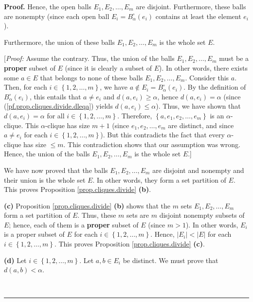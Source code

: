 \documentclass[numbers=enddot,12pt,final,onecolumn,notitlepage]{scrartcl}%
\theoremstyle{definition}
\newenvironment{proof}[1][Proof]{\noindent\textbf{#1.} }{\ \rule{0.5em}{0.5em}}
\renewcommand{\leq}{\leqslant}
\renewcommand{\geq}{\geqslant}
\theoremstyle{plainsl}
\begin{document}
\begin{proof}
Hence, the open balls $E_{1},E_{2},\ldots,E_{m}$ are disjoint. Furthermore,
these balls are nonempty (since each open ball $E_{i}=B_{\alpha}^{\circ
}\left(  e_{i}\right)  $ contains at least the element $e_{i}$).

Furthermore, the union of these balls $E_{1},E_{2},\ldots,E_{m}$ is the whole
set $E$.

[\textit{Proof:} Assume the contrary. Thus, the union of the balls
$E_{1},E_{2},\ldots,E_{m}$ must be a \textbf{proper} subset of $E$ (since it
is clearly a subset of $E$). In other words, there exists some $a\in E$ that
belongs to none of these balls $E_{1},E_{2},\ldots,E_{m}$. Consider this $a$.
Then, for each $i\in\left\{  1,2,\ldots,m\right\}  $, we have $a\notin
E_{i}=B_{\alpha}^{\circ}\left(  e_{i}\right)  $. By the definition of
$B_{\alpha}^{\circ}\left(  e_{i}\right)  $, this entails that $a\neq e_{i}$
and $d\left(  a,e_{i}\right)  \geq\alpha$, hence $d\left(  a,e_{i}\right)
=\alpha$ (since (\ref{pf.prop.cliques.divide.dleqa}) yields $d\left(
a,e_{i}\right)  \leq\alpha$). Thus, we have shown that $d\left(
a,e_{i}\right)  =\alpha$ for all $i\in\left\{  1,2,\ldots,m\right\}  $.
Therefore, $\left\{  a,e_{1},e_{2},\ldots,e_{m}\right\}  $ is an $\alpha
$-clique. This $\alpha$-clique has size $m+1$ (since $e_{1},e_{2},\ldots
,e_{m}$ are distinct, and since $a\neq e_{i}$ for each $i\in\left\{
1,2,\ldots,m\right\}  $). But this contradicts the fact that every $\alpha
$-clique has size $\leq m$. This contradiction shows that our assumption was
wrong. Hence, the union of the balls $E_{1},E_{2},\ldots,E_{m}$ is the whole
set $E$.]

We have now proved that the balls $E_{1},E_{2},\ldots,E_{m}$ are disjoint and
nonempty and their union is the whole set $E$. In other words, they form a set
partition of $E$. This proves Proposition \ref{prop.cliques.divide}
\textbf{(b)}. \medskip

\textbf{(c)} Proposition \ref{prop.cliques.divide} \textbf{(b)} shows that the
$m$ sets $E_{1},E_{2},\ldots,E_{m}$ form a set partition of $E$. Thus, these
$m$ sets are $m$ disjoint nonempty subsets of $E$; hence, each of them is a
\textbf{proper} subset of $E$ (since $m>1$). In other words, $E_{i}$ is a
proper subset of $E$ for each $i\in\left\{  1,2,\ldots,m\right\}  $. Hence,
$\left\vert E_{i}\right\vert <\left\vert E\right\vert $ for each $i\in\left\{
1,2,\ldots,m\right\}  $. This proves Proposition \ref{prop.cliques.divide}
\textbf{(c)}. \medskip

\textbf{(d)} Let $i\in\left\{  1,2,\ldots,m\right\}  $. Let $a,b\in E_{i}$ be
distinct. We must prove that $d\left(  a,b\right)  <\alpha$.


\end{proof}
\end{document}
